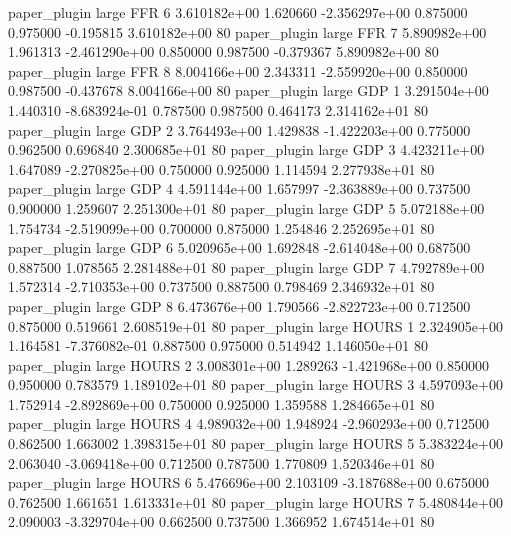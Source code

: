       paper_plugin      large      FFR                 6 3.610182e+00      1.620660 -2.356297e+00 0.875000 0.975000      -0.195815 3.610182e+00 80
       paper_plugin      large      FFR                 7 5.890982e+00      1.961313 -2.461290e+00 0.850000 0.987500      -0.379367 5.890982e+00 80
       paper_plugin      large      FFR                 8 8.004166e+00      2.343311 -2.559920e+00 0.850000 0.987500      -0.437678 8.004166e+00 80
       paper_plugin      large      GDP                 1 3.291504e+00      1.440310 -8.683924e-01 0.787500 0.987500       0.464173 2.314162e+01 80
       paper_plugin      large      GDP                 2 3.764493e+00      1.429838 -1.422203e+00 0.775000 0.962500       0.696840 2.300685e+01 80
       paper_plugin      large      GDP                 3 4.423211e+00      1.647089 -2.270825e+00 0.750000 0.925000       1.114594 2.277938e+01 80
       paper_plugin      large      GDP                 4 4.591144e+00      1.657997 -2.363889e+00 0.737500 0.900000       1.259607 2.251300e+01 80
       paper_plugin      large      GDP                 5 5.072188e+00      1.754734 -2.519099e+00 0.700000 0.875000       1.254846 2.252695e+01 80
       paper_plugin      large      GDP                 6 5.020965e+00      1.692848 -2.614048e+00 0.687500 0.887500       1.078565 2.281488e+01 80
       paper_plugin      large      GDP                 7 4.792789e+00      1.572314 -2.710353e+00 0.737500 0.887500       0.798469 2.346932e+01 80
       paper_plugin      large      GDP                 8 6.473676e+00      1.790566 -2.822723e+00 0.712500 0.875000       0.519661 2.608519e+01 80
       paper_plugin      large    HOURS                 1 2.324905e+00      1.164581 -7.376082e-01 0.887500 0.975000       0.514942 1.146050e+01 80
       paper_plugin      large    HOURS                 2 3.008301e+00      1.289263 -1.421968e+00 0.850000 0.950000       0.783579 1.189102e+01 80
       paper_plugin      large    HOURS                 3 4.597093e+00      1.752914 -2.892869e+00 0.750000 0.925000       1.359588 1.284665e+01 80
       paper_plugin      large    HOURS                 4 4.989032e+00      1.948924 -2.960293e+00 0.712500 0.862500       1.663002 1.398315e+01 80
       paper_plugin      large    HOURS                 5 5.383224e+00      2.063040 -3.069418e+00 0.712500 0.787500       1.770809 1.520346e+01 80
       paper_plugin      large    HOURS                 6 5.476696e+00      2.103109 -3.187688e+00 0.675000 0.762500       1.661651 1.613331e+01 80
       paper_plugin      large    HOURS                 7 5.480844e+00      2.090003 -3.329704e+00 0.662500 0.737500       1.366952 1.674514e+01 80
